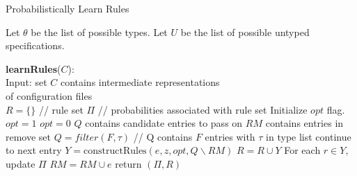 \begin{algorithm}
\caption{Probabilistically Learn Rules}
\label{alg:plearn}
  Let $\theta$ be the list of possible types. 
  Let $U$ be the list of possible untyped specifications. 
  \begin{algorithmic}[1]
  \State \textbf{learnRules}($C$):\\

  Input: set $C$ contains intermediate representations\\ 
     \qquad \enspace \enspace of configuration files\\

    \State $R = \{\}$ // rule set
    \State $\Pi$ // probabilities associated with rule set
      \State Initialize $opt$ flag.
         $opt = 1$
         $opt = 0$
        \EndIf
        \State $Q$ contains candidate entries to pass on %
        \State $RM$ contains entries in remove set
          \State $Q = filter(F,\tau)$ 
          \State // Q contains $F$ entries with $\tau$ in type list
        \EndIf
                        \State continue to next entry
               \Else
                        \State $Y = \textrm{constructRules}(e, z, opt, Q \backslash RM)$
                        \State $R = R  \cup Y$
                        \State For each $r \in Y$, update $\Pi$ 
               \EndIf
               \State $RM = RM \cup e$
        \EndFor
     \EndFor
    \EndFor
    \State return $(\Pi,R)$
  \end{algorithmic}
\end{algorithm}


